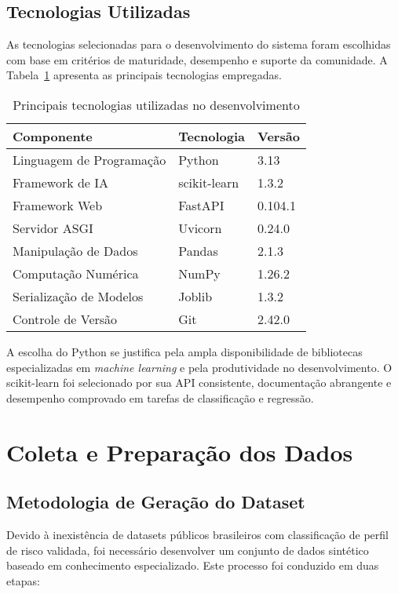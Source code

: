 \subsection{Tecnologias Utilizadas}

As tecnologias selecionadas para o desenvolvimento do sistema foram escolhidas com base em critérios de maturidade, desempenho e suporte da comunidade. A Tabela~\ref{tab:tecnologias} apresenta as principais tecnologias empregadas.

\begin{table}[htbp]
\centering
\caption{Principais tecnologias utilizadas no desenvolvimento}
\label{tab:tecnologias}
\begin{tabular}{@{}lll@{}}
\toprule
\textbf{Componente} & \textbf{Tecnologia} & \textbf{Versão} \\ \midrule
Linguagem de Programação & Python & 3.13 \\
Framework de IA & scikit-learn & 1.3.2 \\
Framework Web & FastAPI & 0.104.1 \\
Servidor ASGI & Uvicorn & 0.24.0 \\
Manipulação de Dados & Pandas & 2.1.3 \\
Computação Numérica & NumPy & 1.26.2 \\
Serialização de Modelos & Joblib & 1.3.2 \\
Controle de Versão & Git & 2.42.0 \\ \bottomrule
\end{tabular}
\end{table}

A escolha do Python se justifica pela ampla disponibilidade de bibliotecas especializadas em \textit{machine learning} e pela produtividade no desenvolvimento. O scikit-learn foi selecionado por sua API consistente, documentação abrangente e desempenho comprovado em tarefas de classificação e regressão.

\section{Coleta e Preparação dos Dados}

\subsection{Metodologia de Geração do Dataset}

Devido à inexistência de datasets públicos brasileiros com classificação de perfil de risco validada, foi necessário desenvolver um conjunto de dados sintético baseado em conhecimento especializado. Este processo foi conduzido em duas etapas:

